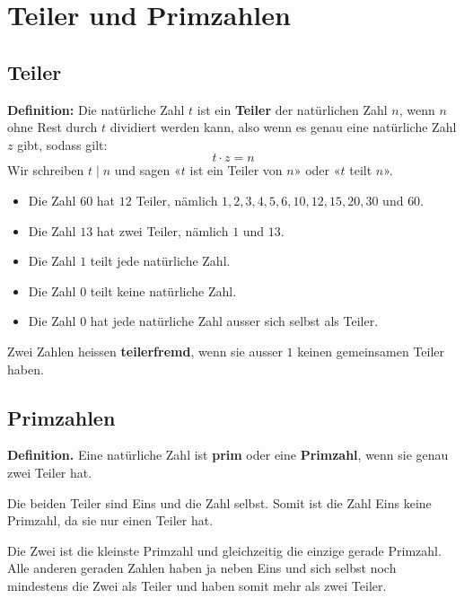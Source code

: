 \newpage
\section{Teiler und Primzahlen}

\subsection{Teiler}

\textbf{Definition:} Die natürliche Zahl $t$ ist ein \textbf{Teiler} der natürlichen Zahl $n$, wenn $n$ ohne Rest durch $t$ dividiert werden kann, also wenn es genau eine natürliche Zahl $z$ gibt, sodass gilt:
  \[
    t\cdot z = n
  \]
Wir schreiben $t\mid n$ und sagen «$t$ ist ein Teiler von $n$» oder «$t$ teilt $n$».
\begin{example}
  \begin{itemize}[noitemsep]
    \item Die Zahl $60$ hat $12$ Teiler, nämlich $1, 2, 3, 4, 5, 6, 10, 12, 15, 20, 30$ und $60$.
    \item Die Zahl $13$ hat zwei Teiler, nämlich $1$ und $13$.
    \item Die Zahl $1$ teilt jede natürliche Zahl.
    \item Die Zahl $0$ teilt keine natürliche Zahl.
    \item Die Zahl $0$ hat jede natürliche Zahl ausser sich selbst als Teiler.
  \end{itemize}
\end{example}

Zwei Zahlen heissen \textbf{teilerfremd}, wenn sie ausser $1$ keinen gemeinsamen Teiler haben.

\subsection{Primzahlen}

\textbf{Definition.} Eine natürliche Zahl ist \textbf{prim} oder eine \textbf{Primzahl}, wenn sie genau zwei Teiler hat.

Die beiden Teiler sind Eins und die Zahl selbst. Somit ist die Zahl Eins keine Primzahl, da sie nur einen Teiler hat.

Die Zwei ist die kleinste Primzahl und gleichzeitig die einzige gerade Primzahl. Alle anderen geraden Zahlen haben ja neben Eins und sich selbst noch mindestens die Zwei als Teiler und haben somit mehr als zwei Teiler.

